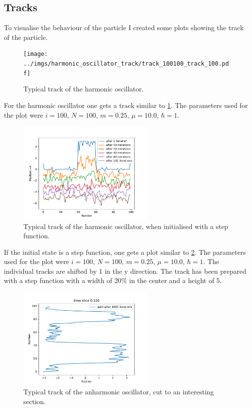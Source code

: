 \documentclass{scrartcl}
\begin{document}
	\subsection{Tracks}
		To visualise the behaviour of the particle I created some plots showing the track of the particle.
		\begin{figure}[H]
			\centering
				\texttt{[image: ../imgs/harmonic\_oscillator\_track/track\_100100\_track\_100.pdf]}
			\caption{Typical track of the harmonic oscillator.}
			\label{fig:harmonic_oscillator_track_100100_track_100}
		\end{figure}
		For the harmonic oscillator one gets a track similar to \ref{fig:harmonic_oscillator_track_100100_track_100}.
		The parameters used for the plot were $i=100$, $N=100$, $m=0.25$, $\mu = 10.0$, $\hbar = 1$.
		\begin{figure}[H]
			\centering
				\includegraphics[width=0.6\textwidth]{../imgs/harmonic_oscillator_track/track_100100_step_track_shifted_double.pdf}
			\caption{Typical track of the harmonic oscillator, when initialised with a step function.}
			\label{fig:harmonic_oscillator_track_100100_100100_step_track_shifted_double}
		\end{figure}
		If the initial state is a step function, one gets a plot similar to \ref{fig:harmonic_oscillator_track_100100_100100_step_track_shifted_double}.
		The parameters used for the plot were $i=100$, $N=100$, $m=0.25$, $\mu = 10.0$, $\hbar = 1$.
		The individual tracks are shifted by 1 in the y direction.
		The track has been prepared with a step function with a width of 20\% in the center and a height of 5.
		\begin{figure}[H]
			\centering
				\includegraphics[width=0.6\textwidth]{../imgs/anharmonic_oscillator_track/track_100010005_track_pretty_1000.pdf}
			\caption{Typical track of the anharmonic oscillator, cut to an interesting section.}
			\label{fig:anharmonic_oscillator_track_100010005_track_pretty_1000}
		\end{figure}
\end{document}
